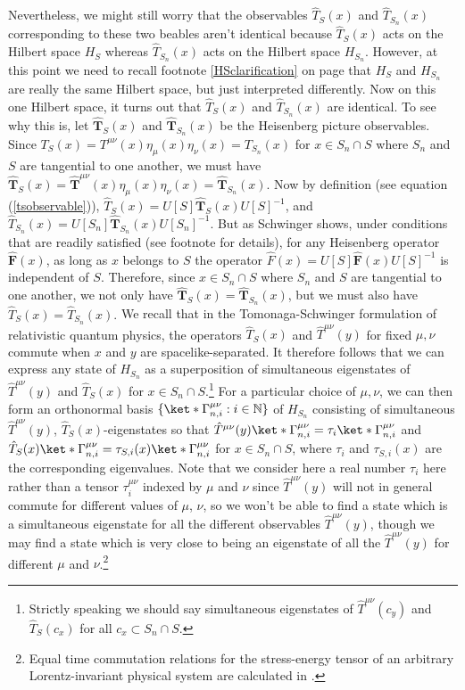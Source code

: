 \documentclass[12pt]{report}
\begin{document}
{Nevertheless, we might still worry that the observables $\hat{T}_{S}(x)$ and  $\hat{T}_{S_n}(x)$ corresponding to these two beables aren't identical because $\hat{T}_{S}(x)$ acts on the Hilbert space $H_S$ whereas $\hat{T}_{S_n}(x)$ acts on the Hilbert space $H_{S_n}$. However, at this point we need to recall footnote \ref{HSclarification} on page \pageref{HSclarification} that $H_{S}$ and $H_{S_n}$ are really the same Hilbert space, but just interpreted differently. Now on this one Hilbert space, it turns out that $\hat{T}_{S}(x)$ and  $\hat{T}_{S_n}(x)$ are identical. To see why this is, let $\hat{\bm{T}}_S(x)$ and $\hat{\bm{T}}_{S_n}(x)$ be the Heisenberg picture observables. Since $T_S(x)=T^{\mu\nu}(x)\eta_{\mu}(x)\eta_{\nu}(x)=T_{S_n}(x)$ for $x\in S_n\cap S$ where $S_n$ and $S$ are tangential to one another, we must have $\hat{\bm{T}}_S(x)=\hat{\bm{T}}^{\mu\nu}(x)\eta_{\mu}(x)\eta_{\nu}(x)=\hat{\bm{T}}_{S_n}(x)$. Now by definition (see equation (\ref{tsobservable})), $\hat{T}_S(x)=U[S]\hat{\bm{T}}_S(x)U[S]^{-1}$, and $\hat{T}_{S_n}(x)=U[S_n]\hat{\bm{T}}_{S_n}(x)U[S_n]^{-1}$.  But as Schwinger shows, under conditions that are readily satisfied (see footnote  for details), for any Heisenberg operator $\hat{\bm{F}}(x)$, as long as $x$ belongs to $S$ the operator $\hat{F}(x)=U[S]\hat{\bm{F}}(x)U[S]^{-1}$ is independent of $S$. Therefore, since $x\in S_n\cap S$ where $S_n$ and $S$ are tangential to one another, we not only have $\hat{\bm{T}}_S(x)=\hat{\bm{T}}_{S_n}(x)$, but we must also have $\hat{T}_S(x)=\hat{T}_{S_n}(x)$.} We recall that in the Tomonaga-Schwinger formulation of relativistic quantum physics, the operators $\hat{T}_S(x)$ and $\hat{T}^{\mu\nu}(y)$ for fixed $\mu,\nu$ commute when $x$ and $y$ are spacelike-separated. It therefore follows that we can express any state of $H_{S_n}$ as a superposition of simultaneous eigenstates of $\hat{T}^{\mu\nu}(y)$ and $\hat{T}_S(x)$ for $x\in S_n\cap S$.\footnote{Strictly \label{snapprox} speaking we should say simultaneous eigenstates of $\hat{T}^{\mu\nu}(c_y)$ and $\hat{T}_S(c_x)$ for all $c_x\subset S_n\cap S$.}  For a particular choice of $\mu,\nu$, we can then form an orthonormal basis $\{\ket*{\Gamma_{n,i}^{\mu\nu}}:i\in\mathbb{N}\}$ of $H_{S_n}$ consisting of simultaneous $\hat{T}^{\mu\nu}(y)$, $\hat{T}_S(x)$-eigenstates so that $\hat{T}^{\mu\nu}(y)\ket*{\Gamma_{n,i}^{\mu\nu}}=\tau_{i}\ket*{\Gamma_{n,i}^{\mu\nu}}$ and $\hat{T}_{S}(x)\ket*{\Gamma_{n,i}^{\mu\nu}}=\tau_{S,i}(x)\ket*{\Gamma_{n,i}^{\mu\nu}}$ for $x\in S_n\cap S$, where $\tau_{i}$ and $\tau_{S,i}(x)$ are the corresponding eigenvalues. Note that we consider here a real number $\tau_{i}$ here rather than a tensor $\tau_i^{\mu\nu}$ indexed by $\mu$ and $\nu$  since $\hat{T}^{\mu\nu}(y)$ will not in general commute for different values of $\mu$, $\nu$, so we won't be able to find a state which is a simultaneous eigenstate for all the different observables $\hat{T}^{\mu\nu}(y)$, though we may find a state which is very close to being an eigenstate of all the  $\hat{T}^{\mu\nu}(y)$ for different $\mu$ and $\nu$.\footnote{\label{equaltimestressenergy}Equal time commutation relations for the stress-energy tensor of an arbitrary Lorentz-invariant physical system are calculated in \cite{BergstromK.1970ECRf}.}  
\end{document}
